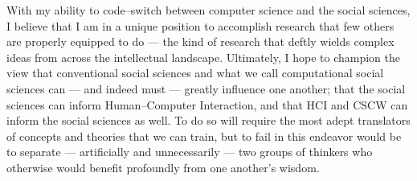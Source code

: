 \documentclass[12pt]{article}
\newcommand{\sectitle}[1]{\textbf{\MakeUppercase{#1}}}
\begin{document}
With my ability to code--switch between computer science and the social sciences,
I believe that I am in a unique position to accomplish research that few others are properly equipped to do
--- the kind of research that deftly wields complex ideas from across the intellectual landscape.
Ultimately,
I hope to champion the view that conventional social sciences and what we call computational social sciences can
--- and indeed must ---
greatly influence one another;
that the social sciences can inform Human--Computer Interaction,
and that HCI and CSCW can inform the social sciences as well.
To do so will require the most adept translators of concepts and theories that we can train,
but to fail in this endeavor would be to separate
--- artificially and unnecessarily ---
two groups of thinkers who otherwise would benefit profoundly from one another's wisdom.


\renewcommand\refname{\sectitle{references}}
% 

{\footnotesize

}
\end{document}
